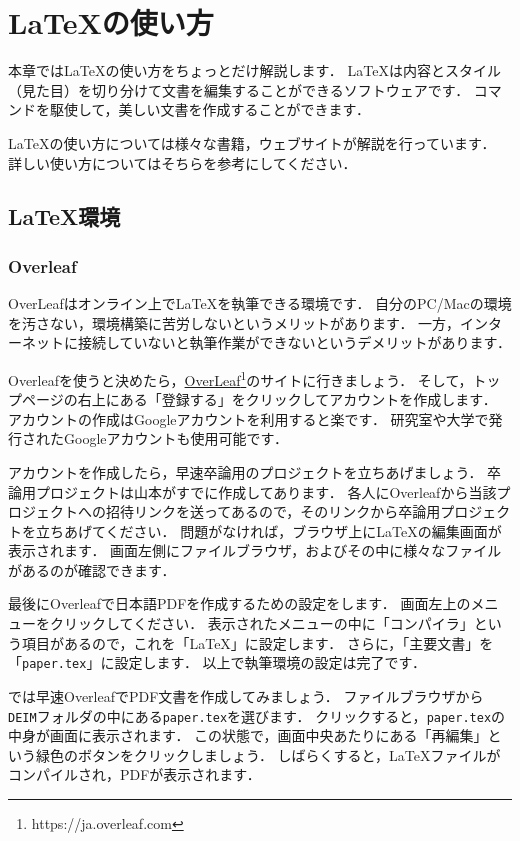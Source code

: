 \section{LaTeXの使い方}
本章ではLaTeXの使い方をちょっとだけ解説します．
LaTeXは内容とスタイル（見た目）を切り分けて文書を編集することができるソフトウェアです．
コマンドを駆使して，美しい文書を作成することができます．

LaTeXの使い方については様々な書籍，ウェブサイトが解説を行っています．
詳しい使い方についてはそちらを参考にしてください．


\subsection{LaTeX環境}
\subsubsection{Overleaf}
OverLeafはオンライン上でLaTeXを執筆できる環境です．
自分のPC/Macの環境を汚さない，環境構築に苦労しないというメリットがあります．
一方，インターネットに接続していないと執筆作業ができないというデメリットがあります．

Overleafを使うと決めたら，\href{https://ja.overleaf.com}{OverLeaf}\footnote{https://ja.overleaf.com}のサイトに行きましょう．
そして，トップページの右上にある「登録する」をクリックしてアカウントを作成します．
アカウントの作成はGoogleアカウントを利用すると楽です．
研究室や大学で発行されたGoogleアカウントも使用可能です．

アカウントを作成したら，早速卒論用のプロジェクトを立ちあげましょう．
卒論用プロジェクトは山本がすでに作成してあります．
各人にOverleafから当該プロジェクトへの招待リンクを送ってあるので，そのリンクから卒論用プロジェクトを立ちあげてください．
問題がなければ，ブラウザ上にLaTeXの編集画面が表示されます．
画面左側にファイルブラウザ，およびその中に様々なファイルがあるのが確認できます．

最後にOverleafで日本語PDFを作成するための設定をします．
画面左上のメニューをクリックしてください．
表示されたメニューの中に「コンパイラ」という項目があるので，これを「LaTeX」に設定します．
さらに，「主要文書」を「\texttt{paper.tex}」に設定します．
以上で執筆環境の設定は完了です．

では早速OverleafでPDF文書を作成してみましょう．
ファイルブラウザから\texttt{DEIM}フォルダの中にある\texttt{paper.tex}を選びます．
クリックすると，\texttt{paper.tex}の中身が画面に表示されます．
この状態で，画面中央あたりにある「再編集」という緑色のボタンをクリックしましょう．
しばらくすると，LaTeXファイルがコンパイルされ，PDFが表示されます．

